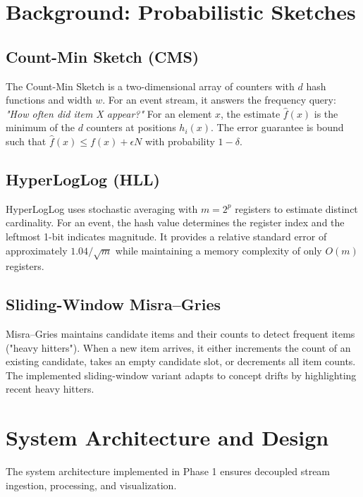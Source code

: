 \documentclass[12pt,a4paper]{article}
\begin{document}
\section{Background: Probabilistic Sketches}
\label{sec:sketches}

\subsection{Count-Min Sketch (CMS)}
The Count-Min Sketch is a two-dimensional array of counters with $d$ hash functions and width $w$. For an event stream, it answers the frequency query: \textit{"How often did item X appear?"}
For an element $x$, the estimate $\hat{f}(x)$ is the minimum of the $d$ counters at positions $h_i(x)$. The error guarantee is bound such that $\hat{f}(x) \le f(x) + \epsilon N$ with probability $1-\delta$.

\subsection{HyperLogLog (HLL)}
HyperLogLog uses stochastic averaging with $m = 2^p$ registers to estimate distinct cardinality. For an event, the hash value determines the register index and the leftmost 1-bit indicates magnitude. It provides a relative standard error of approximately $1.04 / \sqrt{m}$ while maintaining a memory complexity of only $O(m)$ registers.

\subsection{Sliding-Window Misra--Gries}
Misra--Gries maintains candidate items and their counts to detect frequent items ("heavy hitters"). When a new item arrives, it either increments the count of an existing candidate, takes an empty candidate slot, or decrements all item counts. The implemented sliding-window variant adapts to concept drifts by highlighting recent heavy hitters.

\section{System Architecture and Design}
\label{sec:design}

The system architecture implemented in Phase 1 ensures decoupled stream ingestion, processing, and visualization.
\end{document}
